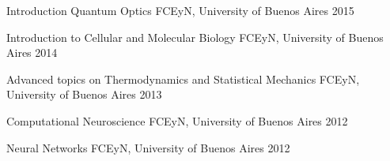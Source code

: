 
\begin{cvhonors}

  \cvhonor
    {Introduction Quantum Optics}
    {FCEyN, University of Buenos Aires} %
    {} %
    {2015} %

  \cvhonor
    {Introduction to Cellular and Molecular Biology}
    {FCEyN, University of Buenos Aires}
    {}
    {2014}

  \cvhonor
    {Advanced topics on Thermodynamics and Statistical Mechanics}
    {FCEyN, University of Buenos Aires}
    {}
    {2013}

  \cvhonor
    {Computational Neuroscience}
    {FCEyN, University of Buenos Aires}
    {}
    {2012}

  \cvhonor
    {Neural Networks}
    {FCEyN, University of Buenos Aires}
    {}
    {2012}

\end{cvhonors}
